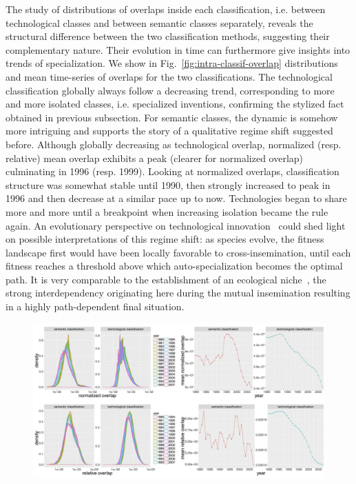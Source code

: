 The study of distributions of overlaps inside each classification, i.e. between technological classes and between semantic classes separately, reveals the structural difference between the two classification methods, suggesting their complementary nature. Their evolution in time can furthermore give insights into trends of specialization. We show in Fig.~\ref{fig:intra-classif-overlap} distributions and mean time-series of overlaps for the two classifications. The technological classification globally always follow a decreasing trend, corresponding to more and more isolated classes, i.e. specialized inventions, confirming the stylized fact obtained in previous subsection. For semantic classes, the dynamic is somehow more intriguing and supports the story of a qualitative regime shift suggested before. Although globally decreasing as technological overlap, normalized (resp. relative) mean overlap exhibits a peak (clearer for normalized overlap) culminating in 1996 (resp. 1999). Looking at normalized overlaps, classification structure was somewhat stable until 1990, then strongly increased to peak in 1996 and then decrease at a similar pace up to now. Technologies began to share more and more until a breakpoint when increasing isolation became the rule again. An evolutionary perspective on technological innovation~\cite{ziman2003technological} could shed light on possible interpretations of this regime shift: as species evolve, the fitness landscape first would have been locally favorable to cross-insemination, until each fitness reaches a threshold above which auto-specialization becomes the optimal path. It is very comparable to the establishment of an ecological niche~\cite{holland2012signals}, the strong interdependency originating here during the mutual insemination resulting in a highly path-dependent final situation. 



\begin{figure}[!ht]
\includegraphics[width=\linewidth]{Figures/Final/C-patentsmining-intra-classif-overlap.jpg}
\label{fig:patentsmining:intra-classif-overlap}
\end{figure}



